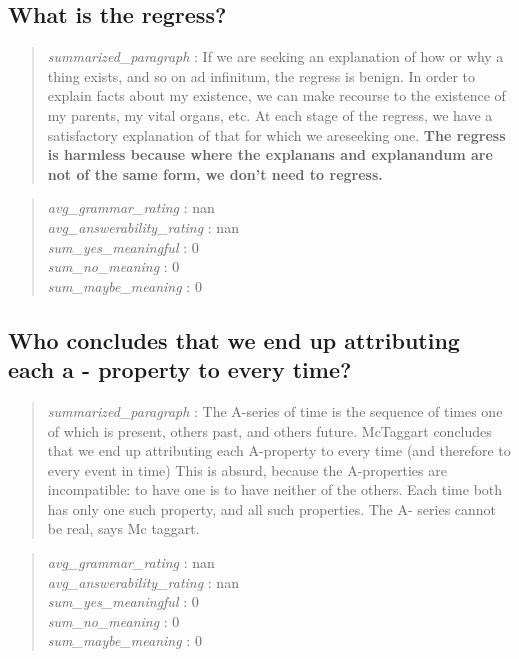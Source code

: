 \hypertarget{what-is-the-regress}{%
\subsection{What is the regress?}\label{what-is-the-regress}}

\begin{quote}
\emph{summarized\_paragraph} : If we are seeking an explanation of how
or why a thing exists, and so on ad infinitum, the regress is benign. In
order to explain facts about my existence, we can make recourse to the
existence of my parents, my vital organs, etc. At each stage of the
regress, we have a satisfactory explanation of that for which we
areseeking one. \textbf{The regress is harmless because where the
explanans and explanandum are not of the same form, we don't need to
regress.}
\end{quote}

\begin{quote}
\emph{avg\_grammar\_rating} : nan\\
\emph{avg\_answerability\_rating} : nan\\
\emph{sum\_yes\_meaningful} : 0\\
\emph{sum\_no\_meaning} : 0\\
\emph{sum\_maybe\_meaning} : 0
\end{quote}

\hypertarget{who-concludes-that-we-end-up-attributing-each-a---property-to-every-time}{%
\subsection{Who concludes that we end up attributing each a - property
to every
time?}\label{who-concludes-that-we-end-up-attributing-each-a---property-to-every-time}}

\begin{quote}
\emph{summarized\_paragraph} : The A-series of time is the sequence of
times one of which is present, others past, and others future. McTaggart
concludes that we end up attributing each A-property to every time (and
therefore to every event in time) This is absurd, because the
A-properties are incompatible: to have one is to have neither of the
others. Each time both has only one such property, and all such
properties. The A- series cannot be real, says Mc taggart.
\end{quote}

\begin{quote}
\emph{avg\_grammar\_rating} : nan\\
\emph{avg\_answerability\_rating} : nan\\
\emph{sum\_yes\_meaningful} : 0\\
\emph{sum\_no\_meaning} : 0\\
\emph{sum\_maybe\_meaning} : 0
\end{quote}

